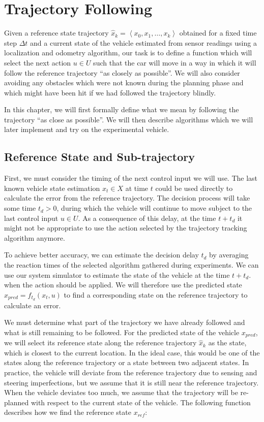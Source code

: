 \chapter{Trajectory Following}
\label{chapter:following}

Given a reference state trajectory $\hat{x}_k=\left\langle x_0, x_1, \ldots, x_k \right\rangle$ obtained for a fixed time step $\Delta t$ and a current state of the vehicle estimated from sensor readings using a localization and odometry algorithm, our task is to define a function which will select the next action $u\in U$ such that the car will move in a way in which it will follow the reference trajectory ``as closely as possible''. We will also consider avoiding any obstacles which were not known during the planning phase and which might have been hit if we had followed the trajectory blindly.

In this chapter, we will first formally define what we mean by following the trajectory ``as close as possible''. We will then describe algorithms which we will later implement and try on the experimental vehicle.

\section{Reference State and Sub-trajectory}

First, we must consider the timing of the next control input we will use. The last known vehicle state estimation $x_t\in X$ at time $t$ could be used directly to calculate the error from the reference trajectory. The decision process will take some time $t_d>0$, during which the vehicle will continue to move subject to the last control input $u\in U$. As a consequence of this delay, at the time $t+t_d$ it might not be appropriate to use the action selected by the trajectory tracking algorithm anymore.

To achieve better accuracy, we can estimate the decision delay $t_d$ by averaging the reaction times of the selected algorithm gathered during experiments. We can use our system simulator to estimate the state of the vehicle at the time $t+t_d$. when the action should be applied. We will therefore use the predicted state $x_{pred}=f_{t_d}(x_t,u)$ to find a corresponding state on the reference trajectory to calculate an error.

We must determine what part of the trajectory we have already followed and what is still remaining to be followed.  For the predicted state of the vehicle $x_{pred}$, we will select its reference state along the reference trajectory $\hat{x}_k$ as the state, which is closest to the current location. In the ideal case, this would be one of the states along the reference trajectory or a state between two adjacent states. In practice, the vehicle will deviate from the reference trajectory due to sensing and steering imperfections, but we assume that it is still near the reference trajectory. When the vehicle deviates too much, we assume that the trajectory will be re-planned with respect to the current state of the vehicle. The following function describes how we find the reference state $x_{ref}$:

